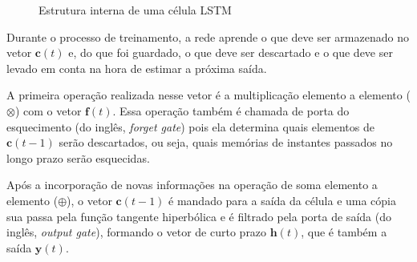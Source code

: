 \documentclass[a4paper, 12pt]{article}
\begin{document}
{\begin{figure}[!ht]
\begin{center}
\caption{Estrutura interna de uma célula LSTM}
\label{fig:lstm}
\end{center}
\end{figure}
}

Durante o processo de treinamento, a rede aprende o que deve ser armazenado no vetor $\mathbf{c}(t)$ e, do que foi guardado, o que deve ser descartado e o que deve ser levado em conta na hora de estimar a próxima saída.

A primeira operação realizada nesse vetor é a multiplicação elemento a elemento ($\otimes$) com o vetor $\mathbf{f}(t)$. Essa operação também é chamada de porta do esquecimento (do inglês, \textit{forget gate}) pois ela determina quais elementos de $\mathbf{c}(t-1)$ serão descartados, ou seja, quais memórias de instantes passados no longo prazo serão esquecidas.

Após a incorporação de novas informações na operação de soma elemento a elemento ($\oplus$), o vetor $\mathbf{c}(t-1)$ é mandado para a saída da célula e uma cópia sua passa pela função tangente hiperbólica e é filtrado pela porta de saída (do inglês, \textit{output gate}), formando o vetor de curto prazo $\mathbf{h}(t)$, que é também a saída $\mathbf{y}(t)$.
\end{document}
